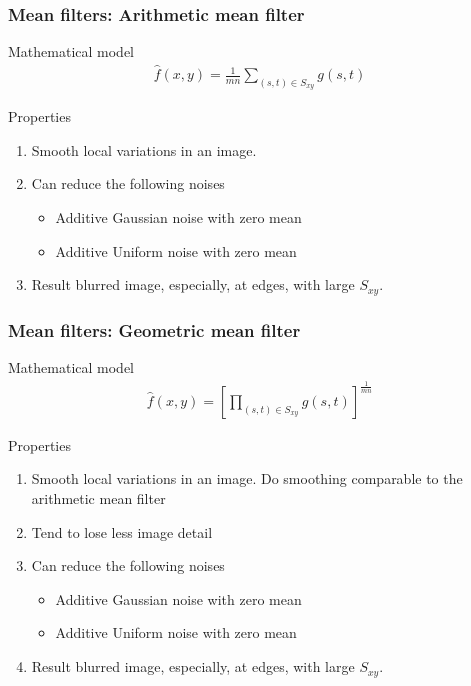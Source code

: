 \documentclass[english,11pt,table,handout]{beamer}
\begin{document}
\frame
{
	\frametitle{Mean filters: Arithmetic mean filter}
	
	\begin{block}{Mathematical model}
		\begin{align}
			\nonumber
			\hat{f}(x,y) = \frac{1}{mn}{\sum_{(s,t) \in S_{xy}} {g(s,t)}}
		\end{align}
	\end{block}
	\begin{alertblock}{Properties}
		\begin{enumerate}
			\item Smooth local variations in an image.
			\item Can reduce the following noises
				\begin{itemize}
					\item Additive Gaussian noise with zero mean
					\item Additive Uniform noise with zero mean
				\end{itemize}
			\item Result blurred image, especially, at edges,  with large $S_{xy}$.
		\end{enumerate}
	\end{alertblock}
	
}
\frame
{
	\frametitle{Mean filters: Geometric mean filter}
	
	\begin{block}{Mathematical model}
		\begin{align}
		\nonumber
		\hat{f}(x,y) = \left[ \prod_{(s,t) \in S_{xy}}{g(s,t)} \right]^{\frac{1}{mn}}
		\end{align}
	\end{block}
	\begin{alertblock}{Properties}
		\begin{enumerate}
			\item Smooth local variations in an image. Do smoothing comparable to the arithmetic mean filter
			\item Tend to lose less image detail
			\item Can reduce the following noises
			\begin{itemize}
				\item Additive Gaussian noise with zero mean
				\item Additive Uniform noise with zero mean
			\end{itemize}
			\item Result blurred image, especially, at edges, with large $S_{xy}$.
		\end{enumerate}
	\end{alertblock}
	
}
\end{document}
